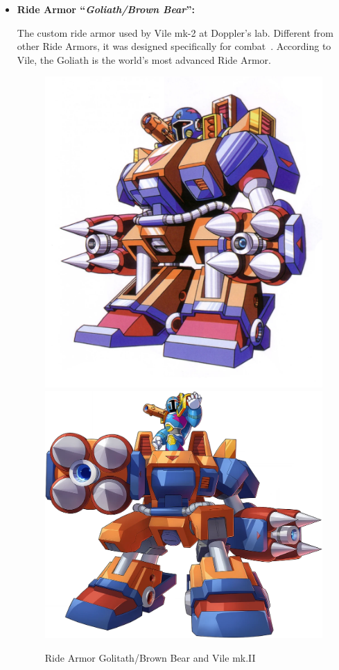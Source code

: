 \begin{itemize}
	\item \hypertarget{vehicle:Ride_Armor_Goliath}{\textbf{Ride Armor ``\textit{Goliath/Brown Bear}'':}} The custom ride armor used by Vile mk-2 at Doppler's lab. Different from 
	other Ride Armors, it was designed specifically for combat~\cite{wayback:X3_resources}. According to Vile, the Goliath is the world's most advanced Ride Armor.~\cite{book:MH_field_guide}
	\begin{figure}[htp]
		\centering
		\includegraphics[height=\portraitsize]{figures/X3/Doppler_stages/vile2_armor.png}
		\includegraphics[height=\portraitsize]{figures/X3/Doppler_stages/X_DiVE_Vile_MK2_on_Goliath.png}
		\caption{Ride Armor Golitath/Brown Bear and Vile mk.II}
	\end{figure}
	

\end{itemize}
